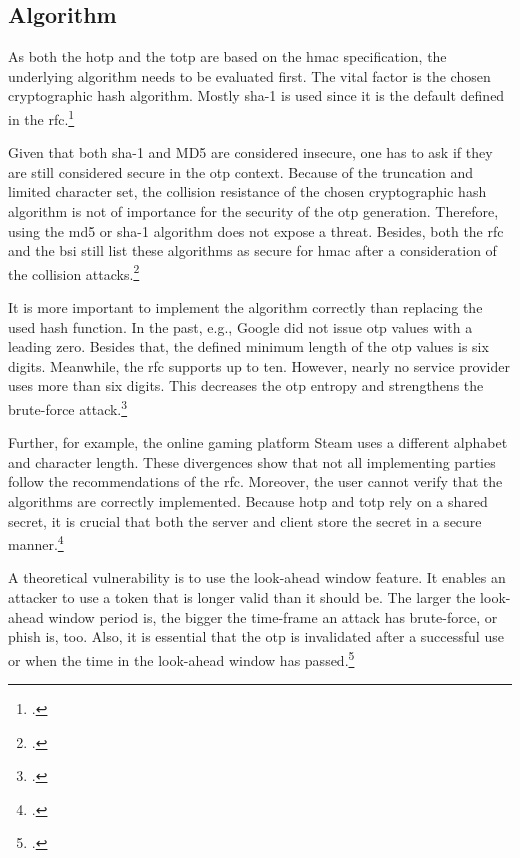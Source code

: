\subsection{Algorithm}

As both the \gls{hotp} and the \gls{totp} are based on the \gls{hmac} specification, the underlying algorithm needs to be evaluated first. The vital factor is the chosen cryptographic hash algorithm. Mostly \gls{sha}-1 is used since it is the default defined in the \gls{rfc}.\footcite[See][3]{m2011rfc}

Given that both \gls{sha}-1 and MD5 are considered insecure, one has to ask if they are still considered secure in the \gls{otp} context. Because of the truncation and limited character set, the collision resistance of the chosen cryptographic hash algorithm is not of importance for the security of the \gls{otp} generation. Therefore, using the \gls{md}5 or \gls{sha}-1 algorithm does not expose a threat. Besides, both the \gls{rfc} and the \gls{bsi} still list these algorithms as secure for \gls{hmac} after a consideration of the collision attacks.\footcites[See][]{10.1007/978-3-319-63688-7_19}[See][18]{bsi2019recommendations}[See][2]{s2011rfc}[See][395]{eckert-it-sec-9}

It is more important to implement the algorithm correctly than replacing the used hash function. In the past, e.g., Google did not issue \gls{otp} values with a leading zero. Besides that, the defined minimum length of the \gls{otp} values is six digits. Meanwhile, the \gls{rfc} supports up to ten. However, nearly no service provider uses more than six digits. This decreases the \gls{otp} entropy and strengthens the brute-force attack.\footcites[See][369]{10.1007/978-3-662-45472-5_24}

Further, for example, the online gaming platform Steam uses a different alphabet and character length. These divergences show that not all implementing parties follow the recommendations of the \gls{rfc}. Moreover, the user cannot verify that the algorithms are correctly implemented. Because \gls{hotp} and \gls{totp} rely on a shared secret, it is crucial that both the server and client store the secret in a secure manner.\footcites[See][6--7]{steam-totp}[See][11--13]{m2005rfc}

A theoretical vulnerability is to use the look-ahead window feature. It enables an attacker to use a token that is longer valid than it should be. The larger the look-ahead window period is, the bigger the time-frame an attack has brute-force, or phish is, too. Also, it is essential that the \gls{otp} is invalidated after a successful use or when the time in the look-ahead window has passed.\footcites[See][369]{10.1007/978-3-662-45472-5_24}[See][11]{m2005rfc}

